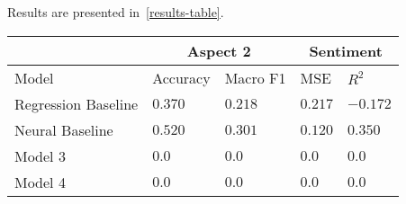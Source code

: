 Results are presented in~\ref{results-table}.

\begin{table*}
    \small
    \caption{Test Error Rates and F1 Scores for Classification, test MSE and R2 for Regression}
    \label{results-table}
    \centering
    \begin{tabular}{lllll}
        \multicolumn{1}{c}{} & \multicolumn{2}{c}{Aspect 2} & \multicolumn{2}{c}{Sentiment} \\
        \hline
        Model                   & Accuracy         & Macro F1         & MSE              & $R^2$ \\
        \midrule
        Regression Baseline     & $0.370$          & $0.218$          & $0.217$          & $-0.172$          \\
        Neural Baseline         & $\mathbf{0.520}$ & $\mathbf{0.301}$ & $\mathbf{0.120}$ & $\mathbf{0.350}$  \\
        Model 3                 & $0.0$            & $0.0$            & $0.0$            & $0.0$             \\
        Model 4                 & $0.0$            & $0.0$            & $0.0$            & $0.0$             \\
        \bottomrule
    \end{tabular}
\end{table*}
